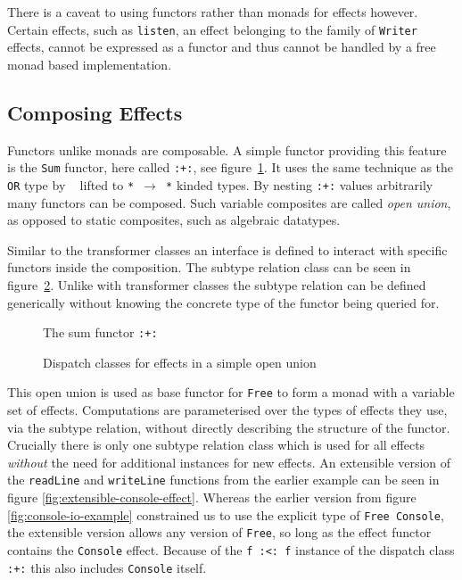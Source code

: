 There is a caveat to using functors rather than monads for effects however.
Certain effects, such as \texttt{listen}, an effect belonging to the family of
\texttt{Writer} effects, cannot be expressed as a functor and thus cannot be
handled by a free monad based implementation.

\subsection{Composing Effects}

\label{sec:simple-effect-composition}

Functors unlike monads are composable. A simple functor providing this feature
is the \texttt{Sum} functor, here called \texttt{:+:}, see
figure~\ref{fig:sum-functor}. It uses the same technique as the \texttt{OR} type
by \citeauthor{data-types-a-la-carte}~\cite{data-types-a-la-carte} lifted to
\texttt{* $\rightarrow$ *} kinded types. By nesting \texttt{:+:} values
arbitrarily many functors can be composed. Such variable composites are called
\emph{open union}, as opposed to static composites, such as algebraic datatypes.

Similar to the transformer classes an interface is defined to interact with
specific functors inside the composition. The subtype relation class can be seen
in figure~\ref{fig:dispatch-class}. Unlike with transformer classes the subtype
relation can be defined generically without knowing the concrete type of the
functor being queried for.

\begin{figure}
  
  \caption{The sum functor \texttt{:+:}}
  \label{fig:sum-functor}
\end{figure}

\begin{figure}
  
  \caption{Dispatch classes for effects in a simple open union}
  \label{fig:dispatch-class}
\end{figure}

This open union is used as base functor for \texttt{Free} to form a monad with a
variable set of effects. Computations are parameterised over the types of
effects they use, via the subtype relation, without directly describing the
structure of the functor. Crucially there is only one subtype relation class
which is used for all effects \emph{without} the need for additional instances
for new effects. An extensible version of the \texttt{readLine} and
\texttt{writeLine} functions from the earlier example can be seen in figure
\ref{fig:extensible-console-effect}. Whereas the earlier version from figure
\ref{fig:console-io-example} constrained us to use the explicit type of
\texttt{Free Console}, the extensible version allows any version of
\texttt{Free}, so long as the effect functor contains the \texttt{Console}
effect. Because of the \texttt{f :<: f} instance of the dispatch class
\texttt{:+:} this also includes \texttt{Console} itself.

